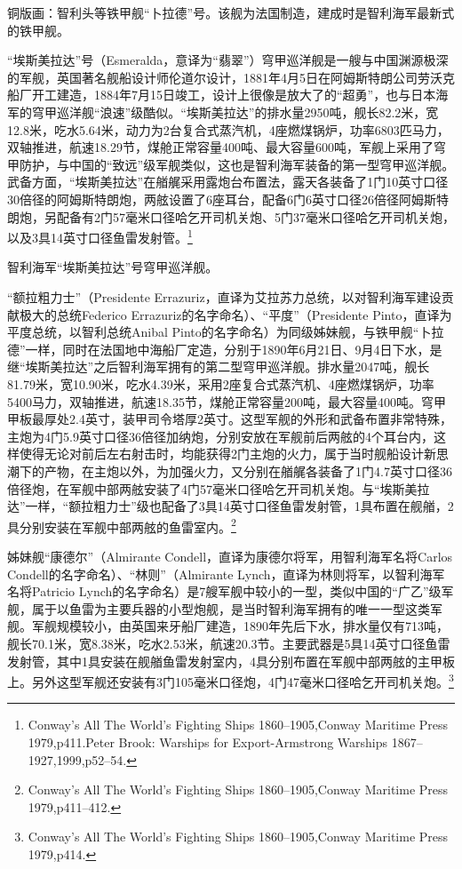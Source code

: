 \documentclass[12pt,UTF8]{ctexbook}
\begin{document}
铜版画：智利头等铁甲舰“卜拉德”号。该舰为法国制造，建成时是智利海军最新式的铁甲舰。

“埃斯美拉达”号（Esmeralda，意译为“翡翠”）穹甲巡洋舰是一艘与中国渊源极深的军舰，英国著名舰船设计师伦道尔设计，1881年4月5日在阿姆斯特朗公司劳沃克船厂开工建造，1884年7月15日竣工，设计上很像是放大了的“超勇”，也与日本海军的穹甲巡洋舰“浪速”级酷似。“埃斯美拉达”的排水量2950吨，舰长82.2米，宽12.8米，吃水5.64米，动力为2台复合式蒸汽机，4座燃煤锅炉，功率6803匹马力，双轴推进，航速18.29节，煤舱正常容量400吨、最大容量600吨，军舰上采用了穹甲防护，与中国的“致远”级军舰类似，这也是智利海军装备的第一型穹甲巡洋舰。武备方面，“埃斯美拉达”在艏艉采用露炮台布置法，露天各装备了1门10英寸口径30倍径的阿姆斯特朗炮，两舷设置了6座耳台，配备6门6英寸口径26倍径阿姆斯特朗炮，另配备有2门57毫米口径哈乞开司机关炮、5门37毫米口径哈乞开司机关炮，以及3具14英寸口径鱼雷发射管。\footnote{Conway's All The World's Fighting Ships 1860--1905,Conway Maritime Press 1979,p411.Peter Brook: Warships for Export-Armstrong Warships 1867--1927,1999,p52--54.}

智利海军“埃斯美拉达”号穹甲巡洋舰。

“额拉粗力士”（Presidente Errazuriz，直译为艾拉苏力总统，以对智利海军建设贡献极大的总统Federico Errazuriz的名字命名）、“平度”（Presidente Pinto，直译为平度总统，以智利总统Anibal Pinto的名字命名）为同级姊妹舰，与铁甲舰“卜拉德”一样，同时在法国地中海船厂定造，分别于1890年6月21日、9月4日下水，是继“埃斯美拉达”之后智利海军拥有的第二型穹甲巡洋舰。排水量2047吨，舰长81.79米，宽10.90米，吃水4.39米，采用2座复合式蒸汽机、4座燃煤锅炉，功率5400马力，双轴推进，航速18.35节，煤舱正常容量200吨，最大容量400吨。穹甲甲板最厚处2.4英寸，装甲司令塔厚2英寸。这型军舰的外形和武备布置非常特殊，主炮为4门5.9英寸口径36倍径加纳炮，分别安放在军舰前后两舷的4个耳台内，这样使得无论对前后左右射击时，均能获得2门主炮的火力，属于当时舰船设计新思潮下的产物，在主炮以外，为加强火力，又分别在艏艉各装备了1门4.7英寸口径36倍径炮，在军舰中部两舷安装了4门57毫米口径哈乞开司机关炮。与“埃斯美拉达”一样，“额拉粗力士”级也配备了3具14英寸口径鱼雷发射管，1具布置在舰艏，2具分别安装在军舰中部两舷的鱼雷室内。\footnote{Conway's All The World's Fighting Ships 1860--1905,Conway Maritime Press 1979,p411--412.}

姊妹舰“康德尔”（Almirante Condell，直译为康德尔将军，用智利海军名将Carlos Condell的名字命名）、“林则”（Almirante Lynch，直译为林则将军，以智利海军名将Patricio Lynch的名字命名）是7艘军舰中较小的一型，类似中国的“广乙”级军舰，属于以鱼雷为主要兵器的小型炮舰，是当时智利海军拥有的唯一一型这类军舰。军舰规模较小，由英国来牙船厂建造，1890年先后下水，排水量仅有713吨，舰长70.1米，宽8.38米，吃水2.53米，航速20.3节。主要武器是5具14英寸口径鱼雷发射管，其中1具安装在舰艏鱼雷发射室内，4具分别布置在军舰中部两舷的主甲板上。另外这型军舰还安装有3门105毫米口径炮，4门47毫米口径哈乞开司机关炮。\footnote{Conway's All The World's Fighting Ships 1860--1905,Conway Maritime Press 1979,p414.}
\end{document}
